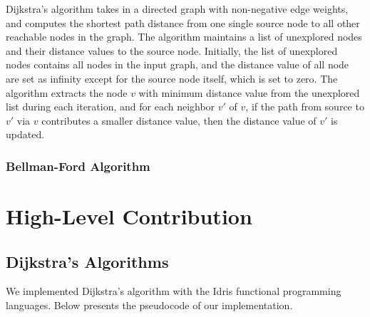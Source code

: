 \documentclass[11pt, a4paper]{article} %
\theoremstyle{definition}
\begin{document}
Dijkstra's algorithm takes in a directed graph with non-negative edge weights, and computes the shortest path distance from one single source node to all other reachable nodes in the graph. The algorithm maintains a list of unexplored nodes and their distance values to the source node. Initially, the list of unexplored nodes contains all nodes in the input graph, and the distance value of all node are set as infinity except for the source node itself, which is set to zero. The algorithm extracts the node $v$ with minimum distance value from the unexplored list during each iteration, and for each neighbor $v'$ of $v$, if the path from source to $v'$ via $v$ contributes a smaller distance value, then the distance value of $v'$ is updated. 

\subsubsection*{Bellman-Ford Algorithm}




\section{High-Level Contribution}
\subsection{Dijkstra's Algorithms}
We implemented Dijkstra's algorithm with the Idris functional programming languages. Below presents the pseudocode of our implementation. 
\end{document}
